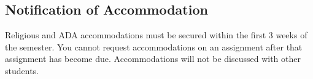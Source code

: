 \documentclass[10pt,]{article}
\begin{document}
\hypertarget{notification-of-accommodation}{%
\subsection{Notification of
Accommodation}\label{notification-of-accommodation}}

Religious and ADA accommodations must be secured within the first 3
weeks of the semester. You cannot request accommodations on an
assignment after that assignment has become due. Accommodations will not
be discussed with other students.
\end{document}
